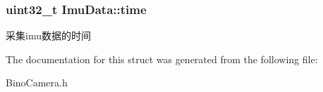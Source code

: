 \subsubsection[{\texorpdfstring{time}{time}}]{\setlength{\rightskip}{0pt plus 5cm}uint32\+\_\+t Imu\+Data\+::time}\hypertarget{structImuData_a6677f5c89b3ceed1830c6a3cf5e66285}{}\label{structImuData_a6677f5c89b3ceed1830c6a3cf5e66285}
采集imu数据的时间 

The documentation for this struct was generated from the following file\+:\begin{DoxyCompactItemize}
\item 
Bino\+Camera.\+h\end{DoxyCompactItemize}
